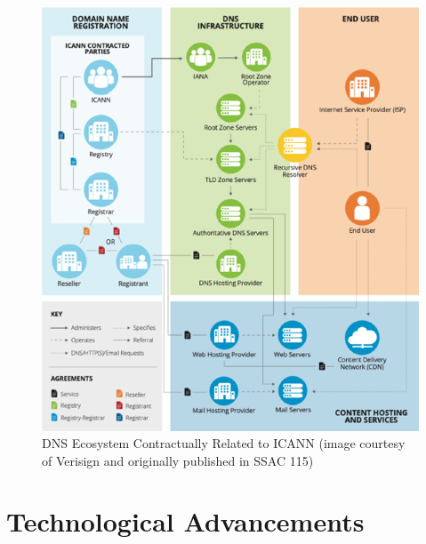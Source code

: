 \clearpage
\captionsetup{font= footnotesize}
\begin{figure}[H]
\centering
    \includegraphics[width=1.0\linewidth]{background/DNSECO.png}
    \caption{DNS Ecosystem Contractually Related to ICANN (image
courtesy of Verisign and originally published in SSAC 115)}
    \label{fig:fig14}
\end{figure}
\clearpage

\section{Technological Advancements}

